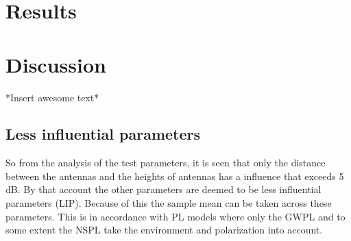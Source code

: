 \section{Results}


\section{Discussion}

*Insert awesome text*

\subsection{Less influential parameters}

So from the analysis of the test parameters, it is seen that only the distance between the antennas and the heights of antennas has a influence that exceeds 5 dB. By that account the other parameters are deemed to be less influential parameters (LIP). Because of this the sample mean can be taken across these parameters. This is in accordance with PL models where only the GWPL and to some extent the NSPL take the environment and polarization into account.






